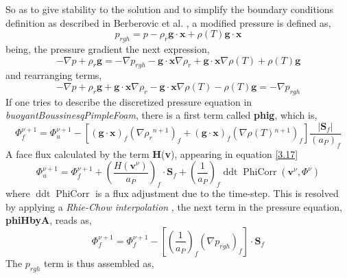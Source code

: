 \noindent So as to give stability to the solution and to simplify the boundary conditions definition as described in Berberovic et al. \cite{berberovic_van_hinsberg_jakirlic_roisman_tropea_2009}, a modified pressure is defined as,
\begin{equation}
	p_{r g h}=p-\rho_{r} \textbf{g} \cdot \textbf{x} + \rho(T) \textbf{g} \cdot \textbf{x}
	\label{3.18}
\end{equation}
being, the pressure gradient the next expression,
\begin{equation}
	-\nabla p+\rho_{r} \textbf{g}=-\nabla p_{r g h}-\textbf{g} \cdot \textbf{x} \nabla \rho_{r} + \textbf{g} \cdot \textbf{x} \nabla \rho(T) + \rho(T) \textbf{g}
	\label{3.19}
\end{equation}
and rearranging terms, 
\begin{equation}
	-\nabla p+\rho_{r} \textbf{g} + \textbf{g} \cdot \textbf{x} \nabla \rho_{r} - \textbf{g} \cdot \textbf{x} \nabla \rho(T) - \rho(T) \textbf{g}=-\nabla p_{r g h}
	\label{3.20}
\end{equation}
If one tries to describe the discretized pressure equation in \textit{buoyantBoussinesqPimpleFoam}, there is a first term called \textbf{phig}, which is,
\begin{equation}
	\Phi_{f}^{\nu+1}=\Phi_{u}^{\nu+1} - \left[(\textbf{g} \cdot \textbf{x})_{f}\left(\nabla \rho_{r}{ }^{n+1}\right)_{f}+(\textbf{g} \cdot \textbf{x})_{f}\left(\nabla \rho(T){ }^{n+1}\right)_{f}\right]\frac{\left|\textbf{S}_{f}\right|}{\left(a_{P}\right)_{f}}
	\label{3.21}
\end{equation}
A face flux calculated by the term \textbf{H}(\textbf{v}), appearing in equation \ref{3.17}
\begin{equation}
	\Phi_{u}^{\nu+1}=\Phi_{f}^{\nu+1} + \left(\frac{H\left(\textbf{v}^{\nu}\right)}{a_{P}}\right)_{f} \cdot \textbf{S}_{f}+\left(\frac{1}{a_{P}}\right)_{f}\operatorname{ddt} \operatorname{PhiCorr}\left(\textbf{v}^{\nu}, \Phi^{\nu}\right)
	\label{3.22}
\end{equation}
where $\operatorname{ddt} \operatorname{PhiCorr}$ is a flux adjustment due to the time-step. This is resolved by applying a \textit{Rhie-Chow interpolation} \cite{rhie_chow_1983}, the next term in the pressure equation, \textbf{phiHbyA}, reads as,
\begin{equation}
	\Phi_{f}^{\nu+1}=\Phi_{f}^{\nu+1}-\left[\left(\frac{1}{a_{P}}\right)_{f}\left(\nabla p_{r g h}\right)_{f}\right] \cdot \textbf{S}_{f}
	\label{3.23}
\end{equation}
The \textbf{$p_{rgh}$} term is thus assembled as,
